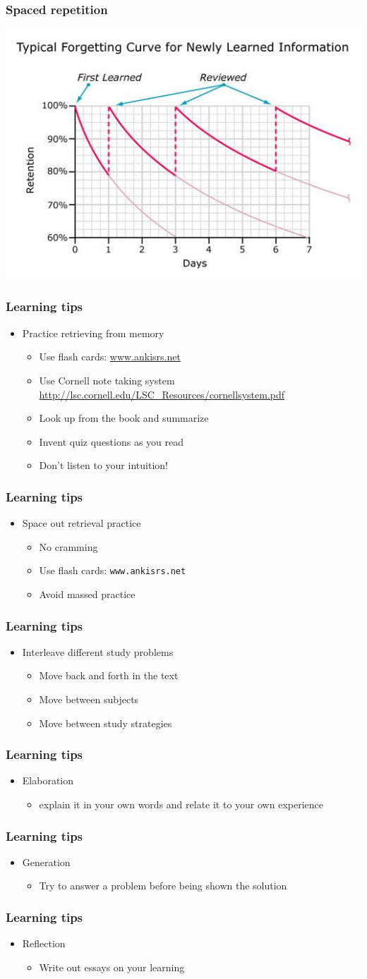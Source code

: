 \documentclass{beamer}
\newcommand{\bi}{\begin{itemize}}
\newcommand{\li}{\item}
\newcommand{\ei}{\end{itemize}}
\newcommand{\bfr}[1]{\begin{frame}[fragile]\frametitle{{ #1 }}}
\begin{document}
\bfr{Spaced repetition}
\begin{center}
\includegraphics[scale=0.5]{ForgettingCurve.jpg}
\end{center}
\end{frame}

\bfr{Learning tips}
\bi
\li Practice retrieving from memory
\bi
\li Use flash cards: \url{www.ankisrs.net}
\li Use Cornell note taking system \\\url{http://lsc.cornell.edu/LSC_Resources/cornellsystem.pdf}
\li Look up from the book and summarize
\li Invent quiz questions as you read
\li Don't listen to your intuition!
\ei
\ei
\end{frame}

\bfr{Learning tips}
\bi
\li Space out retrieval practice
\bi
\li No cramming
\li Use flash cards: {\tt www.ankisrs.net}
\li Avoid massed practice
\ei
\ei
\end{frame}

\bfr{Learning tips}
\bi
\li Interleave different study problems
\bi
\li Move back and forth in the text
\li Move between subjects
\li Move between study strategies
\ei
\ei
\end{frame}

\bfr{Learning tips}
\bi
\li Elaboration
\bi\li explain it in your own words and relate it to your own experience\ei
\ei
\end{frame}

\bfr{Learning tips}
\bi
\li Generation
\bi\li Try to answer a problem before being shown the solution\ei
\ei
\end{frame}

\bfr{Learning tips}
\bi
\li Reflection
\bi\li Write out essays on your learning\ei
\ei
\end{frame}
\end{document}
